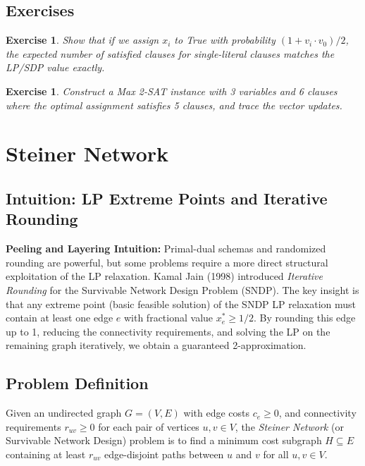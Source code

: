 \documentclass[11pt,oneside]{book}
\newtheorem{exercise}[theorem]{Exercise}
\begin{document}
\section{Exercises}
\begin{exercise}
Show that if we assign $x_i$ to True with probability $(1 + v_i \cdot v_0)/2$, the expected number of satisfied clauses for single-literal clauses matches the LP/SDP value exactly.
\end{exercise}
\begin{exercise}
Construct a Max 2-SAT instance with 3 variables and 6 clauses where the optimal assignment satisfies 5 clauses, and trace the vector updates.
\end{exercise}

\setcounter{chapter}{21}
\chapter{Steiner Network}
\label{ch:steiner_network}

\section{Intuition: LP Extreme Points and Iterative Rounding}

\begin{intuitionbox}
\textbf{Peeling and Layering Intuition:} Primal-dual schemas and randomized rounding are powerful, but some problems require a more direct structural exploitation of the LP relaxation. Kamal Jain (1998) introduced \emph{Iterative Rounding} for the Survivable Network Design Problem (SNDP). The key insight is that any extreme point (basic feasible solution) of the SNDP LP relaxation must contain at least one edge $e$ with fractional value $x_e^* \ge 1/2$. By rounding this edge up to 1, reducing the connectivity requirements, and solving the LP on the remaining graph iteratively, we obtain a guaranteed 2-approximation.
\end{intuitionbox}

\section{Problem Definition}
Given an undirected graph $G = (V, E)$ with edge costs $c_e \ge 0$, and connectivity requirements $r_{uv} \ge 0$ for each pair of vertices $u, v \in V$, the \emph{Steiner Network} (or Survivable Network Design) problem is to find a minimum cost subgraph $H \subseteq E$ containing at least $r_{uv}$ edge-disjoint paths between $u$ and $v$ for all $u, v \in V$.
\end{document}

